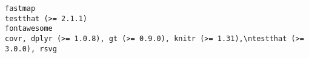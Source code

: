 \documentclass[
  letterpaper,
  DIV=11,
  numbers=noendperiod]{scrreprt}
\begin{document}
\begin{verbatim}
fastmap                                                                                                                                                                                                                                                                                                                                                                                                                                                                                                                                                                                                                                                                                                                                                                                                                                                                                                                                                                                                                                                                                                                                                                                                                                                                                   testthat (>= 2.1.1)
fontawesome                                                                                                                                                                                                                                                                                                                                                                                                                                                                                                                                                                                                                                                                                                                                                                                                                                                                                                                                                                                                                                                                                                                                                                                                                covr, dplyr (>= 1.0.8), gt (>= 0.9.0), knitr (>= 1.31),\ntestthat (>= 3.0.0), rsvg

\end{verbatim}
\end{document}
